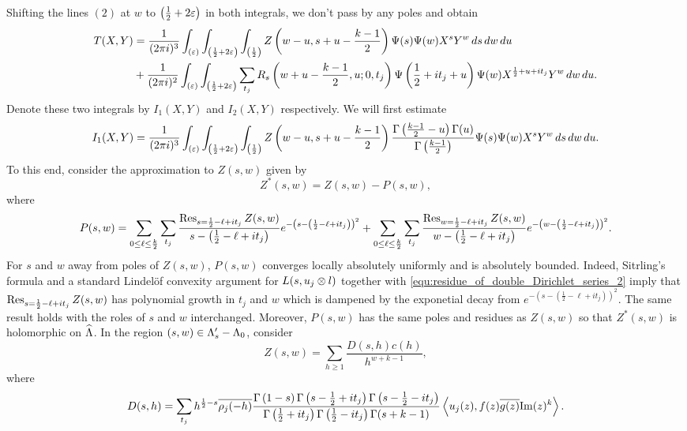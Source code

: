 \documentclass[12pt,reqno,oneside]{amsart}
\begin{document}
  Shifting the lines $(2)$ at $w$ to $\left(\frac{1}{2}+2\varepsilon\right)$ in both integrals, we don't pass by any poles and obtain
  \begin{align*}
    T(X,Y) &= \frac{1}{(2\pi i)^{3}}\int_{(\varepsilon)}\int_{\left(\frac{1}{2}+2\varepsilon\right)}\int_{\left(\frac{1}{2}\right)}Z\left(w-u,s+u-\frac{k-1}{2}\right)\Psi(s)\Psi(w)X^{s}Y^{w}\,ds\,dw\,du \\
    &+ \frac{1}{(2\pi i)^{2}}\int_{(\varepsilon)}\int_{\left(\frac{1}{2}+2\varepsilon\right)}\sum_{t_{j}}R_{s}\left(w+u-\frac{k-1}{2},u;0,t_{j}\right)\Psi\left(\frac{1}{2}+it_{j}+u\right)\Psi(w)X^{\frac{1}{2}+u+it_{j}}Y^{w}\,dw\,du.
  \end{align*}
  Denote these two integrals by $I_{1}(X,Y)$ and $I_{2}(X,Y)$ respectively. We will first estimate
  \[
    I_{1}(X,Y) = \frac{1}{(2\pi i)^{3}}\int_{(\varepsilon)}\int_{\left(\frac{1}{2}+2\varepsilon\right)}\int_{\left(\frac{1}{2}\right)}Z\left(w-u,s+u-\frac{k-1}{2}\right)\frac{\Gamma\left(\frac{k-1}{2}-u\right)\Gamma(u)}{\Gamma\left(\frac{k-1}{2}\right)}\Psi(s)\Psi(w)X^{s}Y^{w}\,ds\,dw\,du.
  \]
  To this end, consider the approximation to $Z(s,w)$ given by
  \[
    Z^{\ast}(s,w) = Z(s,w)-P(s,w),
  \]
  where
  \[
    P(s,w) = \sum_{0 \le \ell \le \frac{k}{2}}\sum_{t_{j}}\frac{\operatorname*{\mathrm{Res}}_{s = \frac{1}{2}-\ell+it_{j}}Z(s,w)}{s-\left(\frac{1}{2}-\ell+it_{j}\right)}e^{-\left(s-\left(\frac{1}{2}-\ell+it_{j}\right)\right)^{2}}+\sum_{0 \le \ell \le \frac{k}{2}}\sum_{t_{j}}\frac{\operatorname*{\mathrm{Res}}_{w = \frac{1}{2}-\ell+it_{j}}Z(s,w)}{w-\left(\frac{1}{2}-\ell+it_{j}\right)}e^{-\left(w-\left(\frac{1}{2}-\ell+it_{j}\right)\right)^{2}}.
  \]
  For $s$ and $w$ away from poles of $Z(s,w)$, $P(s,w)$ converges locally absolutely uniformly and is absolutely bounded. Indeed, Sitrling's formula and a standard Lindel\"of convexity argument for $L(s,u_{j} \otimes l)$ together with \cref{equ:residue_of_double_Dirichlet_series_2} imply that $\operatorname*{\mathrm{Res}}_{s = \frac{1}{2}-\ell+it_{j}}Z(s,w)$ has polynomial growth in $t_{j}$ and $w$ which is dampened by the exponetial decay from $e^{-\left(s-\left(\frac{1}{2}-\ell+it_{j}\right)\right)^{2}}$. The same result holds with the roles of $s$ and $w$ interchanged. Moreover, $P(s,w)$ has the same poles and residues as $Z(s,w)$ so that $Z^{\ast}(s,w)$ is holomorphic on $\widehat{\Lambda}$. In the region $(s,w) \in \Lambda_{s}'-\Lambda_{0}$, consider
  \[
    Z(s,w) = \sum_{h \ge 1}\frac{D(s,h)c(h)}{h^{w+k-1}},
  \]
  where
  \[
    D(s,h) = \sum_{t_{j}}h^{\frac{1}{2}-s}\overline{\rho_{j}(-h)}\frac{\Gamma\left(1-s\right)\Gamma\left(s-\frac{1}{2}+it_{j}\right)\Gamma\left(s-\frac{1}{2}-it_{j}\right)}{\Gamma\left(\frac{1}{2}+it_{j}\right)\Gamma\left(\frac{1}{2}-it_{j}\right)\Gamma(s+k-1)}\left\langle u_{j}(z),f(z)\overline{g(z)}\mathrm{Im}(z)^{k}\right\rangle.
  \]
\end{document}
